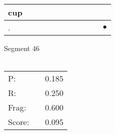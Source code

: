 \documentclass[landscape]{article}
\newcommand{\ssp}{\hspace{2pt}}
\newcommand{\mex}{\cellcolor{g}$\bullet$}
\begin{document}
\begin{tabular}{|l|p{10pt}|p{10pt}|p{10pt}|p{10pt}|p{10pt}|p{10pt}|p{10pt}|p{10pt}|p{10pt}|p{10pt}|}
\hline
\ssp cup \ssp&\hspace{2pt}&\hspace{2pt}&\hspace{2pt}&\hspace{2pt}&\hspace{2pt}&\hspace{2pt}&\hspace{2pt}&\hspace{2pt}&\hspace{2pt}&\hspace{2pt}\\
\hline
\ssp \cellcolor{ref9}. \ssp&\hspace{2pt}&\hspace{2pt}&\hspace{2pt}&\hspace{2pt}&\hspace{2pt}&\hspace{2pt}&\hspace{2pt}&\hspace{2pt}&\hspace{2pt}&\hspace{2pt}\mex\\
\hline
\end{tabular}

\vspace{6pt}
\noindent Segment 46\\\\
\noindent\begin{tabular}{lm{12pt}r}
\hline
P:&&0.185\\
R:&&0.250\\
Frag:&&0.600\\
Score:&&0.095\\
\end{tabular}

\newpage
\end{document}
